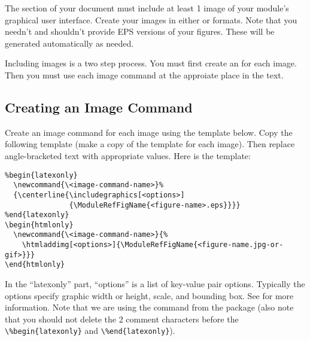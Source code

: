 \documentclass[11pt]{article}
\begin{document}
The  section of your document must include at
least 1 image of your module's graphical user interface. Create your
images in either  or  formats.  Note that
you needn't and shouldn't provide EPS versions of your figures.  These
will be generated automatically as needed.

Including images is a two step process.  You must first create an
 for each image.   Then you must use each
image command at the approiate place in the text.


\subsection{Creating an Image Command}
\label{sec:crimgcmd}

Create an image command for each image using the template below.  Copy the
following template (make a copy of the template for each image).  Then
replace angle-bracketed text with appropriate values.  Here is the template:

\begin{verbatim}
%begin{latexonly}
  \newcommand{\<image-command-name>}%
  {\centerline{\includegraphics[<options>]
               {\ModuleRefFigName{<figure-name>.eps}}}}
%end{latexonly}
\begin{htmlonly}
  \newcommand{\<image-command-name>}{%
    \htmladdimg[<options>]{\ModuleRefFigName{<figure-name.jpg-or-gif>}}}
\end{htmlonly}
\end{verbatim}



In the ``latexonly'' part, ``options'' is a list of key-value pair options.
Typically the options specify graphic width or height, scale, and bounding
box.  See  for more information.  Note
that we are using the  command from the
 package (also note that you should not delete the 2
comment characters before the \verb|\%begin{latexonly}| and
\verb|\%end{latexonly}|). 
\end{document}
